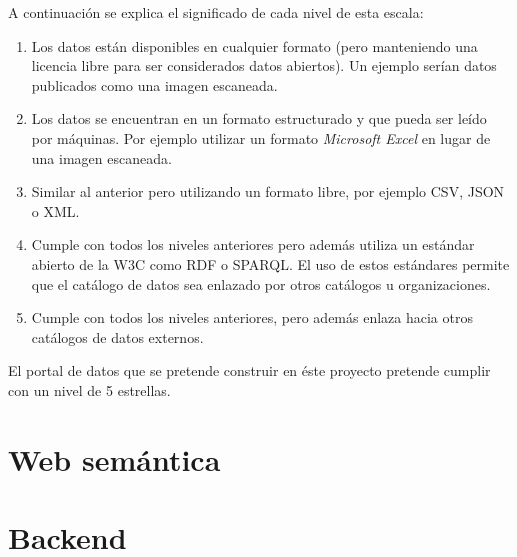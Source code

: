 A continuación se explica el significado de cada nivel de esta escala:
\begin{enumerate}
    \item Los datos están disponibles en cualquier formato (pero manteniendo una licencia libre para ser considerados datos abiertos).  Un ejemplo serían datos publicados como una imagen escaneada.
    \item Los datos se encuentran en un formato estructurado y que pueda ser leído por máquinas.  Por ejemplo utilizar un formato \textit{Microsoft Excel} en lugar de una imagen escaneada.
    \item Similar al anterior pero utilizando un formato libre, por ejemplo CSV, JSON o XML.
    \item Cumple con todos los niveles anteriores pero además utiliza un estándar abierto de la W3C como RDF o SPARQL.  El uso de estos estándares permite que el catálogo de datos sea enlazado por otros catálogos u organizaciones.
    \item Cumple con todos los niveles anteriores, pero además enlaza hacia otros catálogos de datos externos.
\end{enumerate}

El portal de datos que se pretende construir en éste proyecto pretende cumplir con un nivel de 5 estrellas.




\section{Web semántica}



\section{Backend}